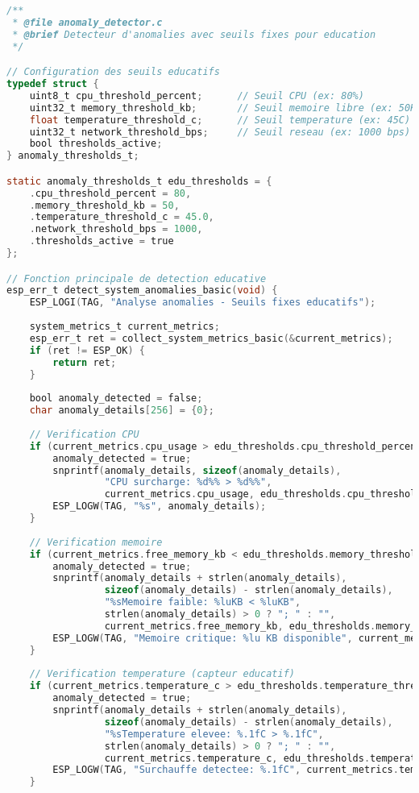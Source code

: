\begin{lstlisting}[language=C, caption={Detecteur d'anomalies educatif - anomaly\_detector.c}, label=lst:anomaly-detector]
/**
 * @file anomaly_detector.c  
 * @brief Detecteur d'anomalies avec seuils fixes pour education
 */

// Configuration des seuils educatifs
typedef struct {
    uint8_t cpu_threshold_percent;      // Seuil CPU (ex: 80%)
    uint32_t memory_threshold_kb;       // Seuil memoire libre (ex: 50KB)
    float temperature_threshold_c;      // Seuil temperature (ex: 45C)
    uint32_t network_threshold_bps;     // Seuil reseau (ex: 1000 bps)
    bool thresholds_active;
} anomaly_thresholds_t;

static anomaly_thresholds_t edu_thresholds = {
    .cpu_threshold_percent = 80,
    .memory_threshold_kb = 50,
    .temperature_threshold_c = 45.0,
    .network_threshold_bps = 1000,
    .thresholds_active = true
};

// Fonction principale de detection educative
esp_err_t detect_system_anomalies_basic(void) {
    ESP_LOGI(TAG, "Analyse anomalies - Seuils fixes educatifs");
    
    system_metrics_t current_metrics;
    esp_err_t ret = collect_system_metrics_basic(&current_metrics);
    if (ret != ESP_OK) {
        return ret;
    }
    
    bool anomaly_detected = false;
    char anomaly_details[256] = {0};
    
    // Verification CPU
    if (current_metrics.cpu_usage > edu_thresholds.cpu_threshold_percent) {
        anomaly_detected = true;
        snprintf(anomaly_details, sizeof(anomaly_details), 
                 "CPU surcharge: %d%% > %d%%", 
                 current_metrics.cpu_usage, edu_thresholds.cpu_threshold_percent);
        ESP_LOGW(TAG, "%s", anomaly_details);
    }
    
    // Verification memoire
    if (current_metrics.free_memory_kb < edu_thresholds.memory_threshold_kb) {
        anomaly_detected = true;
        snprintf(anomaly_details + strlen(anomaly_details), 
                 sizeof(anomaly_details) - strlen(anomaly_details),
                 "%sMemoire faible: %luKB < %luKB", 
                 strlen(anomaly_details) > 0 ? "; " : "",
                 current_metrics.free_memory_kb, edu_thresholds.memory_threshold_kb);
        ESP_LOGW(TAG, "Memoire critique: %lu KB disponible", current_metrics.free_memory_kb);
    }
    
    // Verification temperature (capteur educatif)
    if (current_metrics.temperature_c > edu_thresholds.temperature_threshold_c) {
        anomaly_detected = true;
        snprintf(anomaly_details + strlen(anomaly_details),
                 sizeof(anomaly_details) - strlen(anomaly_details),
                 "%sTemperature elevee: %.1fC > %.1fC",
                 strlen(anomaly_details) > 0 ? "; " : "",
                 current_metrics.temperature_c, edu_thresholds.temperature_threshold_c);
        ESP_LOGW(TAG, "Surchauffe detectee: %.1fC", current_metrics.temperature_c);
    }
    

\end{lstlisting}
